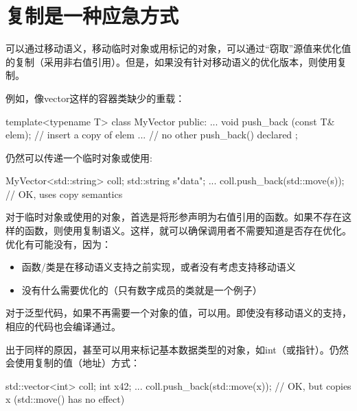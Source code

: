 \section{复制是一种应急方式}
可以通过移动语义，移动临时对象或用标记的对象，可以通过“窃取”源值来优化值的复制（采用非右值引用）。但是，如果没有针对移动语义的优化版本，则使用复制。

例如，像vector这样的容器类缺少的重载：

\begin{cppcode}
template<typename T>
class MyVector {
	public:
	...
	void push_back (const T& elem); // insert a copy of elem
	... // no other push_back() declared
};
\end{cppcode}

仍然可以传递一个临时对象或使用:

\begin{cppcode}
MyVector<std::string> coll;
std::string s{"data"};
...
coll.push_back(std::move(s)); // OK, uses copy semantics
\end{cppcode}

对于临时对象或使用的对象，首选是将形参声明为右值引用的函数。如果不存在这样的函数，则使用复制语义。这样，就可以确保调用者不需要知道是否存在优化。优化有可能没有，因为：


\begin{itemize}
	\item 函数/类是在移动语义支持之前实现，或者没有考虑支持移动语义
	\item 没有什么需要优化的（只有数字成员的类就是一个例子）
\end{itemize}

对于泛型代码，如果不再需要一个对象的值，可以用。即使没有移动语义的支持，相应的代码也会编译通过。


出于同样的原因，甚至可以用来标记基本数据类型的对象，如int（或指针）。仍然会使用复制的值（地址）方式：


\begin{cppcode}
std::vector<int> coll;
int x{42};
...
coll.push_back(std::move(x)); // OK, but copies x (std::move() has no effect)
\end{cppcode}


	